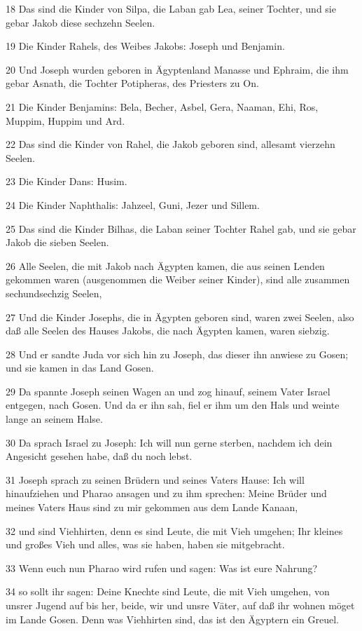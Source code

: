 \par 18 Das sind die Kinder von Silpa, die Laban gab Lea, seiner Tochter, und sie gebar Jakob diese sechzehn Seelen.
\par 19 Die Kinder Rahels, des Weibes Jakobs: Joseph und Benjamin.
\par 20 Und Joseph wurden geboren in Ägyptenland Manasse und Ephraim, die ihm gebar Asnath, die Tochter Potipheras, des Priesters zu On.
\par 21 Die Kinder Benjamins: Bela, Becher, Asbel, Gera, Naaman, Ehi, Ros, Muppim, Huppim und Ard.
\par 22 Das sind die Kinder von Rahel, die Jakob geboren sind, allesamt vierzehn Seelen.
\par 23 Die Kinder Dans: Husim.
\par 24 Die Kinder Naphthalis: Jahzeel, Guni, Jezer und Sillem.
\par 25 Das sind die Kinder Bilhas, die Laban seiner Tochter Rahel gab, und sie gebar Jakob die sieben Seelen.
\par 26 Alle Seelen, die mit Jakob nach Ägypten kamen, die aus seinen Lenden gekommen waren (ausgenommen die Weiber seiner Kinder), sind alle zusammen sechundsechzig Seelen,
\par 27 Und die Kinder Josephs, die in Ägypten geboren sind, waren zwei Seelen, also daß alle Seelen des Hauses Jakobs, die nach Ägypten kamen, waren siebzig.
\par 28 Und er sandte Juda vor sich hin zu Joseph, das dieser ihn anwiese zu Gosen; und sie kamen in das Land Gosen.
\par 29 Da spannte Joseph seinen Wagen an und zog hinauf, seinem Vater Israel entgegen, nach Gosen. Und da er ihn sah, fiel er ihm um den Hals und weinte lange an seinem Halse.
\par 30 Da sprach Israel zu Joseph: Ich will nun gerne sterben, nachdem ich dein Angesicht gesehen habe, daß du noch lebst.
\par 31 Joseph sprach zu seinen Brüdern und seines Vaters Hause: Ich will hinaufziehen und Pharao ansagen und zu ihm sprechen: Meine Brüder und meines Vaters Haus sind zu mir gekommen aus dem Lande Kanaan,
\par 32 und sind Viehhirten, denn es sind Leute, die mit Vieh umgehen; Ihr kleines und großes Vieh und alles, was sie haben, haben sie mitgebracht.
\par 33 Wenn euch nun Pharao wird rufen und sagen: Was ist eure Nahrung?
\par 34 so sollt ihr sagen: Deine Knechte sind Leute, die mit Vieh umgehen, von unsrer Jugend auf bis her, beide, wir und unsre Väter, auf daß ihr wohnen möget im Lande Gosen. Denn was Viehhirten sind, das ist den Ägyptern ein Greuel.

